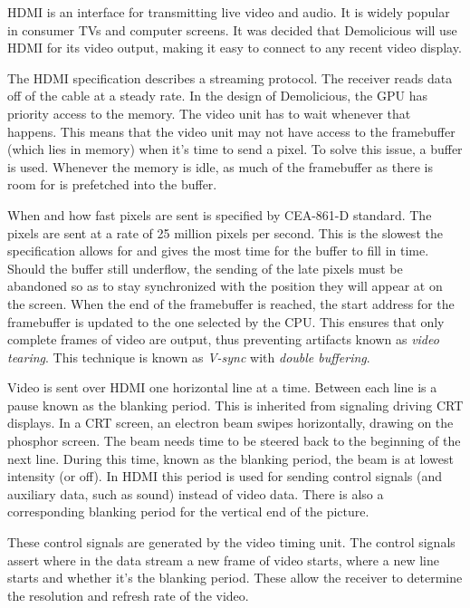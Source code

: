 \documentclass[../main/report.tex]{subfiles}
\begin{document}
HDMI is an interface for transmitting live video and audio.
It is widely popular in consumer TVs and computer screens.
It was decided that Demolicious will use HDMI for its video output, making it easy to connect to any recent video display.

The HDMI specification\cite{hdmi-spec} describes a streaming protocol.
The receiver reads data off of the cable at a steady rate.
In the design of Demolicious, the GPU has priority access to the memory.
The video unit has to wait whenever that happens.
This means that the video unit may not have access to the framebuffer (which lies in memory) when it's time to send a pixel.
To solve this issue, a buffer is used.
Whenever the memory is idle, as much of the framebuffer as there is room for is prefetched into the buffer.

When and how fast pixels are sent is specified by CEA-861-D\cite{timings-spec} standard.
The pixels are sent at a rate of 25 million pixels per second.
This is the slowest the specification allows for and gives the most time for the buffer to fill in time.
Should the buffer still underflow, the sending of the late pixels must be abandoned so as to stay synchronized with the position they will appear at on the screen.
When the end of the framebuffer is reached, the start address for the framebuffer is updated to the one selected by the CPU.
This ensures that only complete frames of video are output, thus preventing artifacts known as \emph{video tearing}.
This technique is known as \emph{V-sync} with \emph{double buffering}.

Video is sent over HDMI one horizontal line at a time.
Between each line is a pause known as the blanking period.
This is inherited from signaling driving CRT displays.
In a CRT screen, an electron beam swipes horizontally, drawing on the phosphor screen.
The beam needs time to be steered back to the beginning of the next line.
During this time, known as the blanking period, the beam is at lowest intensity (or off).
In HDMI this period is used for sending control signals (and auxiliary data, such as sound) instead of video data.
There is also a corresponding blanking period for the vertical end of the picture.

These control signals are generated by the video timing unit.
The control signals assert where in the data stream a new frame of video starts, where a new line starts and whether it's the blanking period.
These allow the receiver to determine the resolution and refresh rate of the video.
\end{document}
